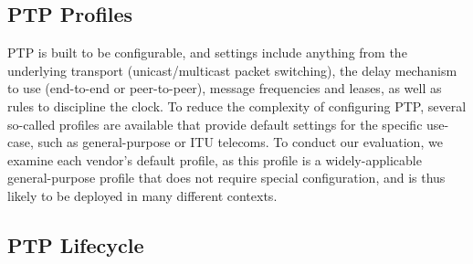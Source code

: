 \subsection{PTP Profiles}
PTP is built to be configurable, and settings include anything from the underlying transport (unicast/multicast packet switching), the delay mechanism to use (end-to-end or peer-to-peer), message frequencies and leases, as well as rules to discipline the clock. To reduce the complexity of configuring PTP, several so-called profiles are available that provide default settings for the specific use-case, such as general-purpose or ITU telecoms. To conduct our evaluation, we examine each vendor's default profile, as this profile is a widely-applicable general-purpose profile that does not require special configuration, and is thus likely to be deployed in many different contexts.


\subsection{PTP Lifecycle}


